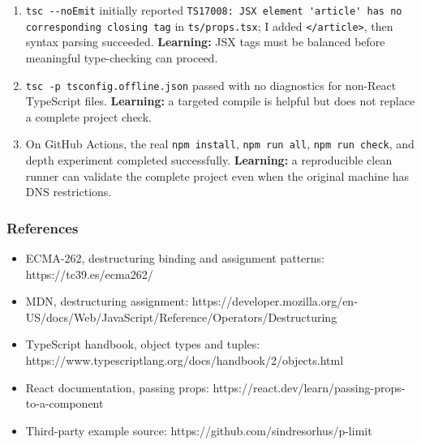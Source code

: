 \documentclass[
  10pt,
]{article}
\newcommand{\passthrough}[1]{#1}
\providecommand{\tightlist}{%
  \setlength{\itemsep}{0pt}\setlength{\parskip}{0pt}}
\begin{document}
\begin{enumerate}
\item
  \passthrough{\lstinline!tsc --noEmit!} initially reported
  \passthrough{\lstinline!TS17008: JSX element 'article' has no corresponding closing tag!}
  in \passthrough{\lstinline!ts/props.tsx!}; I added
  \passthrough{\lstinline!</article>!}, then syntax parsing succeeded.
  \textbf{Learning:} JSX tags must be balanced before meaningful
  type-checking can proceed.
\item
  \passthrough{\lstinline!tsc -p tsconfig.offline.json!} passed with no
  diagnostics for non-React TypeScript files. \textbf{Learning:} a
  targeted compile is helpful but does not replace a complete project
  check.
\item
  On GitHub Actions, the real \passthrough{\lstinline!npm install!},
  \passthrough{\lstinline!npm run all!},
  \passthrough{\lstinline!npm run check!}, and depth experiment
  completed successfully. \textbf{Learning:} a reproducible clean runner
  can validate the complete project even when the original machine has
  DNS restrictions.
\end{enumerate}

\subsubsection{References}\label{references}

\begin{itemize}
\tightlist
\item
  ECMA-262, destructuring binding and assignment patterns:
  https://tc39.es/ecma262/
\item
  MDN, destructuring assignment:
  https://developer.mozilla.org/en-US/docs/Web/JavaScript/Reference/Operators/Destructuring
\item
  TypeScript handbook, object types and tuples:
  https://www.typescriptlang.org/docs/handbook/2/objects.html
\item
  React documentation, passing props:
  https://react.dev/learn/passing-props-to-a-component
\item
  Third-party example source: https://github.com/sindresorhus/p-limit
\end{itemize}
\end{document}
